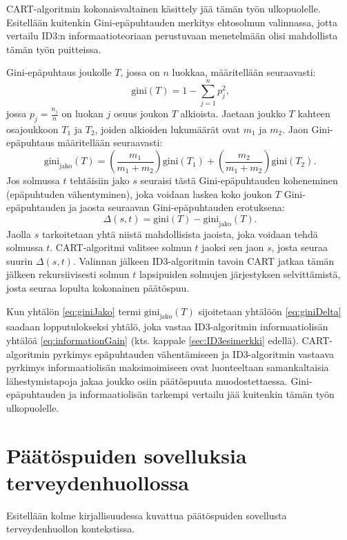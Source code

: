 \documentclass[12pt,finnish]{tktltiki2}
\theoremstyle{definition}
\theoremstyle{remark}
\begin{document}
CART-algoritmin kokonaisvaltainen käsittely jää tämän työn ulkopuolelle. Esitellään kuitenkin
Gini-epäpuhtauden merkitys ehtosolmun valinnassa, jotta vertailu ID3:n
informaatioteoriaan perustuvaan menetelmään olisi mahdollista tämän työn puitteissa.

Gini-epäpuhtaus joukolle $T$, jossa on $n$ luokkaa, määritellään seuraavasti:
\begin{equation*}
\textrm{gini}(T) = 1 -\sum_{j=1}^{n} p_j^2 \mbox{,}
\end{equation*}
jossa $p_j=\frac{n_j}{n}$ on luokan $j$ osuus joukon $T$ alkioista. Jaetaan joukko $T$ kahteen osajoukkoon
$T_1$ ja $T_2$, joiden alkioiden lukumäärät ovat $m_1$ ja $m_2$. Jaon Gini-epäpuhtaus määritellään seuraavasti:
\begin{equation}
\label{eq:giniJako}
\textrm{gini}_{\textrm{jako}}(T) = \left(\frac{m_1}{m_1+m_2}\right)\textrm{gini}(T_1) + \left(\frac{m_2}{m_1+m_2}\right)\textrm{gini}(T_2) \mbox{.}
\end{equation}
Jos solmussa $t$ tehtäisiin jako $s$ seuraisi tästä Gini-epäpuhtauden koheneminen (epäpuhtuden vähentyminen), joka voidaan
laskea koko joukon $T$ Gini-epäpuhtauden ja jaosta seuraavan Gini-epäpuhtauden erotuksena:
\begin{equation}
\label{eq:giniDelta}
\Delta(s,t) = \textrm{gini}(T) - \textrm{gini}_{\textrm{jako}}(T) \mbox{.}
\end{equation}
Jaolla $s$ tarkoitetaan yhtä niistä mahdollisista jaoista, joka voidaan tehdä solmussa $t$.
CART-algoritmi valitsee solmun $t$ jaoksi sen jaon $s$, josta seuraa suurin $\Delta(s,t)$.
Valinnan jälkeen ID3-algoritmin tavoin CART jatkaa tämän jälkeen rekursiivisesti solmun $t$
lapsipuiden solmujen järjestyksen selvittämistä, josta seuraa lopulta kokonainen päätöspuu.

Kun yhtälön \ref{eq:giniJako} termi ${\textrm{gini}_{\textrm{jako}}(T)}$ sijoitetaan yhtälöön \ref{eq:giniDelta}
saadaan lopputulokseksi yhtälö, joka vastaa ID3-algoritmin informaatiolisän yhtälöä \ref{eq:informationGain} (kts.
kappale \ref{sec:ID3esimerkki} edellä). CART-algoritmin pyrkimys epäpuhtauden vähentämiseen ja ID3-algoritmin
vastaava pyrkimys informaatiolisän maksimoimiseen ovat luonteeltaan samankaltaisia lähestymistapoja jakaa
joukko osiin päätöspuuta muodostettaessa. Gini-epäpuhtauden ja informaatiolisän tarkempi vertailu jää kuitenkin
tämän työn ulkopuolelle.


\section{Päätöspuiden sovelluksia terveydenhuollossa}
\label{sec:sovellukset_terveydenhuollossa}
Esitellään kolme kirjallisuudessa kuvattua päätöspuiden sovellusta terveydenhuollon kontekstissa.
\cite{JamaCDSreview}
\end{document}
